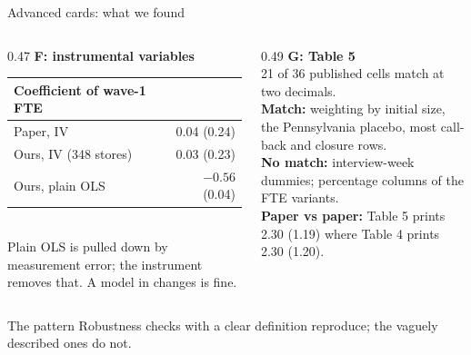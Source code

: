 \documentclass[aspectratio=169,11pt]{beamer}
\begin{document}
\begin{frame}{Advanced cards: what we found}
\begin{columns}[T]
\begin{column}{0.47\textwidth}
\textbf{F: instrumental variables}\\[0.3em]
\small
\begin{tabular}{@{}lr@{}}
\toprule
Coefficient of wave-1 FTE & \\
\midrule
Paper, IV & 0.04 (0.24)\\
Ours, IV (348 stores) & 0.03 (0.23)\\
Ours, plain OLS & \alert{$-0.56$ (0.04)}\\
\bottomrule
\end{tabular}\\[0.4em]
Plain OLS is pulled down by measurement error; the instrument removes that. A model in changes is fine.
\end{column}
\begin{column}{0.49\textwidth}
\textbf{G: Table 5}\\[0.3em]
\small
\alert{21 of 36} published cells match at two decimals.\\[0.3em]
\footnotesize
\textbf{Match:} weighting by initial size, the Pennsylvania placebo, most call-back and closure rows.\\[0.2em]
\textbf{No match:} interview-week dummies; percentage columns of the FTE variants.\\[0.2em]
\textbf{Paper vs paper:} Table 5 prints 2.30 (1.19) where Table 4 prints 2.30 (1.20).
\end{column}
\end{columns}
\vspace{0.6em}
\begin{alertblock}{The pattern}
Robustness checks with a clear definition reproduce; the vaguely described ones do not.
\end{alertblock}
\end{frame}
\end{document}
